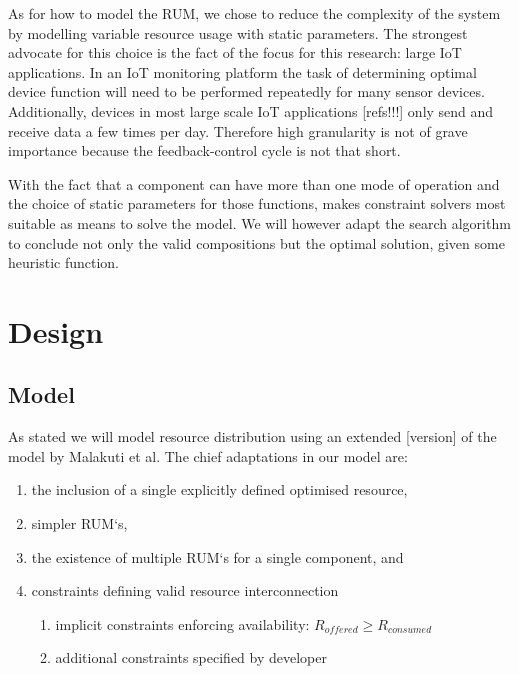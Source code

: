 As for how to model the RUM, we chose to reduce the complexity of the system by modelling variable resource usage with static parameters. The strongest advocate for this choice is the fact of the focus for this research: large IoT applications. In an IoT monitoring platform the task of determining optimal device function will need to be performed repeatedly for many sensor devices. Additionally, devices in most large scale IoT applications [refs!!!] only send and receive data a few times per day. Therefore high granularity is not of grave importance because the feedback-control cycle is not that short. 

With the fact that a component can have more than one mode of operation and the choice of static parameters for those functions, makes constraint solvers most suitable as means to solve the model. We will however adapt the search algorithm to conclude not only the valid compositions but the optimal solution, given some heuristic function.

\section{Design}
\subsection{Model}
As stated we will model resource distribution using an extended [version] of the model by Malakuti et al\cite{steven_te_brinke}. The chief adaptations in our model are:
\begin{enumerate}
\item the inclusion of a single explicitly defined optimised resource,
\item simpler RUM`s,
\item the existence of multiple RUM`s for a single component, and
\item constraints defining valid resource interconnection
\begin{enumerate}
\item implicit constraints enforcing availability: $R_{offered} \geq R_{consumed}$
\item additional constraints specified by developer
\end{enumerate}
\end{enumerate}

